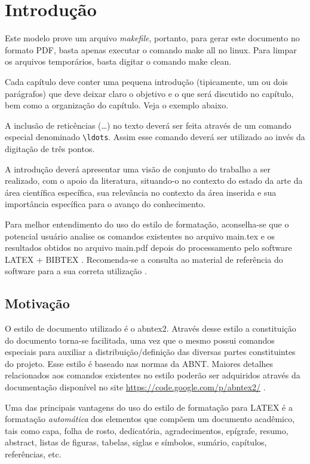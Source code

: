 %
%

\chapter{Introdução}\label{chap:introducao}

Este modelo prove um arquivo \textit{makefile}, portanto, para gerar este documento no formato PDF, basta apenas executar o comando {\ttfamily make all} no linux. Para limpar os arquivos temporários, basta digitar o comando {\ttfamily make clean}.

Cada capítulo deve conter uma pequena introdução (tipicamente, um ou dois parágrafos) que deve deixar claro o objetivo e o que será discutido no capítulo, bem como a organização do capítulo.
Veja o exemplo abaixo.

A inclusão de reticências (\ldots) no texto deverá ser feita através de um comando especial denominado \verb|\ldots|.
Assim esse comando deverá ser utilizado ao invés da digitação de três pontos.

A introdução deverá apresentar uma visão de conjunto do trabalho a ser realizado, com o apoio da literatura, situando-o no contexto do estado da arte da área científica específica, sua relevância no contexto da área inserida e sua importância específica para o avanço do conhecimento.

Para melhor entendimento do uso do estilo de formatação, aconselha-se que o potencial usuário analise os comandos existentes no arquivo {\ttfamily main.tex} e os resultados obtidos no arquivo {\ttfamily main.pdf} depois do processamento pelo software LATEX + BIBTEX \cite{LaTeX2009,BibTeX2009}.
Recomenda-se a consulta ao material de referência do software para a sua correta utilização \cite{Lamport1986,Buerger1989,Kopka2003,Mittelbach2004}.

\section{Motivação}
\label{sec:motivacao}

O estilo de documento utilizado é o {\ttfamily abntex2}.
Através desse estilo a constituição do documento torna-se facilitada, uma vez que o mesmo possui comandos especiais para auxiliar a distribuição/definição das diversas partes constituintes do projeto.
Esse estilo é baseado nas normas da ABNT.
Maiores detalhes relacionados aos comandos existentes no estilo poderão ser adquiridos através da documentação disponível no site \href{https://code.google.com/p/abntex2/}{https://code.google.com/p/abntex2/} \cite{abntex2classe}.

Uma das principais vantagens do uso do estilo de formatação para LATEX é a formatação \textit{automática} dos elementos que compõem um documento acadêmico, tais como capa, folha de rosto, dedicatória, agradecimentos, epígrafe, resumo, abstract, listas de figuras, tabelas, siglas e símbolos, sumário, capítulos, referências, etc.
